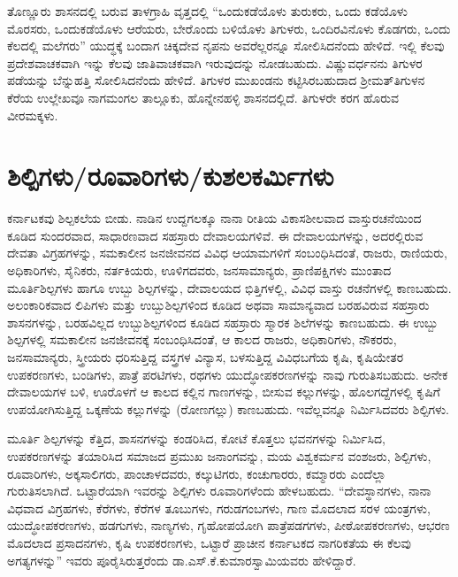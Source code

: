 ತೊಣ್ಣೂರು ಶಾಸನದಲ್ಲಿ ಬರುವ ತಾಳಗ್ರಾಹಿ ವೃತ್ತದಲ್ಲಿ “ಒಂದುಕಡೆಯೊಳು ತುರುಕರು, ಒಂದು ಕಡೆಯೊಳು ಮೊರಸರು, ಒಂದುಕಡೆಯೊಳು ಆರೆಯರು, ಬೇರೊಂದು ಬಳಿಯೊಳು ತಿಗುಳರು, ಒಂದಿರವಿನೊಳು ಕೊಡಗರು, ಒಂದು ಕೆಲದಲ್ಲಿ ಮಲೆಗರು” ಯುದ್ಧಕ್ಕೆ ಬಂದಾಗ ಚಿಕ್ಕದೇವ ನೃಪನು ಅವರೆಲ್ಲರನ್ನೂ ಸೋಲಿಸಿದನೆಂದು ಹೇಳಿದೆ. ಇಲ್ಲಿ ಕೆಲವು ಪ್ರದೇಶವಾಚಕವಾಗಿ ಇನ್ನು ಕೆಲವು ಜಾತಿವಾಚಕವಾಗಿ ಇರುವುದನ್ನು ನೋಡಬಹುದು. ವಿಷ್ಣುವರ್ಧನನು ತಿಗುಳರ ಪಡೆಯನ್ನು ಬೆನ್ನುಹತ್ತಿ ಸೋಲಿಸಿದನೆಂದು ಹೇಳಿದೆ. ತಿಗುಳರ ಮುಖಂಡನು ಕಟ್ಟಿಸಿರಬಹುದಾದ ಶ‍್ರೀಮತ್​ ತಿಗುಳನ ಕೆರೆಯ ಉಲ್ಲೇಖವೂ ನಾಗಮಂಗಲ ತಾಲ್ಲೂಕು, ಹೊನ್ನೇನಹಳ್ಳಿ ಶಾಸನದಲ್ಲಿದೆ. ತಿಗುಳರೇ ಕರಗ ಹೊರುವ ವೀರಮಕ್ಕಳು.

\section*{ಶಿಲ್ಪಿಗಳು/ರೂವಾರಿಗಳು/ಕುಶಲಕರ್ಮಿಗಳು}

ಕರ್ನಾಟಕವು ಶಿಲ್ಪಕಲೆಯ ಬೀಡು. ನಾಡಿನ ಉದ್ದಗಲಕ್ಕೂ ನಾನಾ ರೀತಿಯ ವಿಕಾಸಶೀಲವಾದ ವಾಸ್ತುರಚನೆಯಿಂದ ಕೂಡಿದ ಸುಂದರವಾದ, ಸಾಧಾರಣವಾದ ಸಹಸ್ರಾರು ದೇವಾಲಯಗಳಿವೆ. ಈ ದೇವಾಲಯಗಳನ್ನು, ಅದರಲ್ಲಿರುವ ದೇವತಾ ವಿಗ್ರಹಗಳನ್ನು, ಸಮಕಾಲೀನ ಜನಜೀವನದ ವಿವಿಧ ಆಯಾಮಗಳಿಗೆ ಸಂಬಂಧಿಸಿದಂತೆ, ರಾಜರು, ರಾಣಿಯರು, ಅಧಿಕಾರಿಗಳು, ಸೈನಿಕರು, ನರ್ತಕಿಯರು, ಊಳಿಗದವರು, ಜನಸಾಮಾನ್ಯರು, ಪ್ರಾಣಿಪಕ್ಷಿಗಳು ಮುಂತಾದ ಮೂರ್ತಿಶಿಲ್ಪಗಳು ಹಾಗೂ ಉಬ್ಬು ಶಿಲ್ಪಗಳನ್ನು, ದೇವಾಲಯದ ಭಿತ್ತಿಗಳಲ್ಲಿ, ವಿವಿಧ ವಾಸ್ತು ರಚನೆಗಳಲ್ಲಿ ಕಾಣಬಹುದು. ಅಲಂಕಾರಿಕವಾದ ಲಿಪಿಗಳು ಮತ್ತು ಉಬ್ಬುಶಿಲ್ಪಗಳಿಂದ ಕೂಡಿದ ಅಥವಾ ಸಾಮಾನ್ಯವಾದ ಬರಹವಿರುವ ಸಹಸ್ರಾರು ಶಾಸನಗಳನ್ನು, ಬರಹವಿಲ್ಲದ ಉಬ್ಬುಶಿಲ್ಪಗಳಿಂದ ಕೂಡಿದ ಸಹಸ್ರಾರು ಸ್ಮಾರಕ ಶಿಲೆಗಳನ್ನು ಕಾಣಬಹುದು. ಈ ಉಬ್ಬು ಶಿಲ್ಪಗಳಲ್ಲಿ ಸಮಕಾಲೀನ ಜನಜೀವನಕ್ಕೆ ಸಂಬಂಧಿಸಿದಂತೆ, ಆ ಕಾಲದ ರಾಜರು, ಅಧಿಕಾರಿಗಳು, ನೌಕರರು, ಜನಸಾಮಾನ್ಯರು, ಸ್ತ್ರೀಯರು ಧರಿಸುತ್ತಿದ್ದ ವಸ್ತ್ರಗಳ ವಿನ್ಯಾಸ, ಬಳಸುತ್ತಿದ್ದ ವಿವಿಧಬಗೆಯ ಕೃಷಿ, ಕೃಷಿಯೇತರ ಉಪಕರಣಗಳು, ಬಂಡಿಗಳು, ಪಾತ್ರೆ ಪರಟಿಗಳು, ರಥಗಳು ಯುದ್ಧೋಪಕರಣಗಳನ್ನು ನಾವು ಗುರುತಿಸಬಹುದು. ಅನೇಕ ದೇವಾಲಯಗಳ ಬಳಿ, ಊರೊಳಗೆ ಆ ಕಾಲದ ಕಲ್ಲಿನ ಗಾಣಗಳನ್ನು, ಬೀಸುವ ಕಲ್ಲುಗಳನ್ನು, ಹೊಲಗದ್ದೆಗಳಲ್ಲಿ ಕೃಷಿಗೆ ಉಪಯೋಗಿಸುತ್ತಿದ್ದ ಒಕ್ಕಣೆಯ ಕಲ್ಲುಗಳನ್ನು (ರೋಣಗಲ್ಲು) ಕಾಣಬಹುದು. ಇವೆಲ್ಲವನ್ನೂ ನಿರ್ಮಿಸಿದವರು ಶಿಲ್ಪಿಗಳು.

\vskip 3pt

ಮೂರ್ತಿ ಶಿಲ್ಪಗಳನ್ನು ಕೆತ್ತಿದ, ಶಾಸನಗಳನ್ನು ಕಂಡರಿಸಿದ, ಕೋಟೆ ಕೊತ್ತಲು ಭವನಗಳನ್ನು ನಿರ್ಮಿಸಿದ, ಉಪಕರಣ\-ಗಳನ್ನು ತಯಾರಿಸಿದ ಸಮಾಜದ ಪ್ರಮುಖ ಜನಾಂಗವನ್ನು, ಮಯ ವಿಶ್ವಕರ್ಮನ ವಂಶಜರು, ಶಿಲ್ಪಿಗಳು, ರೂವಾರಿಗಳು, ಅಕ್ಕಸಾಲಿಗರು, ಪಾಂಚಾಳದವರು, ಕಲ್ಕುಟಿಗರು, ಕಂಚುಗಾರರು, ಕಮ್ಮಾರರು ಎಂದೆಲ್ಲಾ ಗುರುತಿಸಲಾಗಿದೆ. ಒಟ್ಟಾರೆಯಾಗಿ ಇವರನ್ನು ಶಿಲ್ಪಿಗಳು ರೂವಾರಿಗಳೆಂದು ಹೇಳಬಹುದು. “ದೇವಸ್ಥಾನಗಳು, ನಾನಾ ವಿಧವಾದ ವಿಗ್ರಹಗಳು, ಕೆರೆಗಳು, ಕೆರೆಗಳ ತೂಬುಗಳು, ಗರುಡಗಂಬಗಳು, ಗಾಣ ಮೊದಲಾದ ಸರಳ ಯಂತ್ರಗಳು, ಯುದ್ಧೋಪಕರಣಗಳು, ಹಡಗುಗಳು, ನಾಣ್ಯಗಳು, ಗೃಹೋಪ\-ಯೋಗಿ ಪಾತ್ರೆಪಡಗಗಳು, ಪೀಠೋಪಕರಣಗಳು, ಆಭರಣ ಮೊದಲಾದ ಪ್ರಸಾದನಗಳು, ಕೃಷಿ ಉಪಕರಣಗಳು, ಒಟ್ಟಾರೆ ಪ್ರಾಚೀನ ಕರ್ನಾಟಕದ ನಾಗರಿಕತೆಯ ಈ ಕೆಲವು ಅಗತ್ಯಗಳನ್ನು” ಇವರು ಪೂರೈಸಿರುತ್ತರೆಂದು ಡಾ.ಎಸ್​.ಕೆ.ಕುಮಾರಸ್ವಾಮಿ\-ಯವರು ಹೇಳಿದ್ದಾರೆ.

